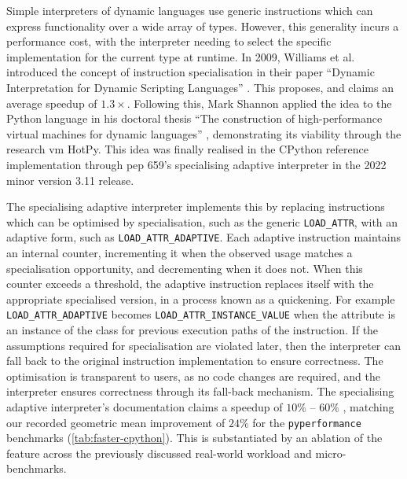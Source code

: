 Simple interpreters of dynamic languages use generic instructions which can express functionality over a wide array of types. However, this generality incurs a performance cost, with the interpreter needing to select the specific implementation for the current type at runtime.
In 2009, Williams et al. introduced the concept of instruction specialisation in their paper ``Dynamic Interpretation for Dynamic Scripting Languages'' \cite{williamsDynamicInterpretationDynamic2010}.
This proposes, and claims an average speedup of $1.3\times$.
Following this, Mark Shannon applied the idea to the Python language in his doctoral thesis ``The construction of high-performance virtual
machines for dynamic languages'' \cite{shannonConstructionHighperformanceVirtual2011}, demonstrating its viability through the research \ac{vm} HotPy.
This idea was finally realised in the CPython reference implementation through \ac{pep} 659's specialising adaptive interpreter in the 2022 minor version 3.11 release.

The specialising adaptive interpreter implements this by replacing instructions which can be optimised by specialisation, such as the generic \texttt{LOAD\_ATTR}, with an adaptive form, such as \texttt{LOAD\_ATTR\_ADAPTIVE}. Each adaptive instruction maintains an internal counter, incrementing it when the observed usage matches a specialisation opportunity, and decrementing when it does not. When this counter exceeds a threshold, the adaptive instruction replaces itself with the appropriate specialised version, in a process known as a quickening. For example \texttt{LOAD\_ATTR\_ADAPTIVE} becomes \texttt{LOAD\_ATTR\_INSTANCE\_VALUE} when the attribute is an instance of the class for previous execution paths of the instruction.
If the assumptions required for specialisation are violated later, then the interpreter can fall back to the original instruction implementation to ensure correctness.
The optimisation is transparent to users, as no code changes are required, and the interpreter ensures correctness through its fall-back mechanism.
The specialising adaptive interpreter's documentation claims a speedup of $10\%$ -- $60\%$ \cite{pep659}, matching our recorded geometric mean improvement of $24\%$ for the \texttt{pyperformance} benchmarks (\autoref{tab:faster-cpython}).
This is substantiated by an ablation of the feature across the previously discussed real-world workload and micro-benchmarks.


